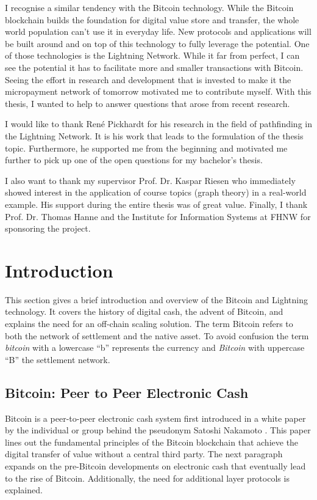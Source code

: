 \documentclass[final]{fhnwreport}       %
\begin{document}
I recognise a similar tendency with the Bitcoin technology. While the Bitcoin blockchain builds the foundation for digital value store and transfer, the whole world population can't use it in everyday life. New protocols and applications will be built around and on top of this technology to fully leverage the potential. One of those technologies is the Lightning Network. While it far from perfect, I can see the potential it has to facilitate more and smaller transactions with Bitcoin. Seeing the effort in research and development that is invested to make it the micropayment network of tomorrow motivated me to contribute myself. With this thesis, I wanted to help to answer questions that arose from recent research.

I would like to thank René Pickhardt for his research in the field of pathfinding in the Lightning Network. It is his work that leads to the formulation of the thesis topic. Furthermore, he supported me from the beginning and motivated me further to pick up one of the open questions for my bachelor's thesis.

I also want to thank my supervisor Prof. Dr. Kaspar Riesen who immediately showed interest in the application of course topics (graph theory) in a real-world example. His support during the entire thesis was of great value. Finally, I thank Prof. Dr. Thomas Hanne and the Institute for Information Systems at FHNW for sponsoring the project.

\clearpage
{}
\section{Introduction} 
This section gives a brief introduction and overview of the Bitcoin and Lightning technology. It covers the history of digital cash, the advent of Bitcoin, and explains the need for an off-chain scaling solution. The term Bitcoin refers to both the network of settlement and the native asset. To avoid confusion the term \emph{bitcoin} with a lowercase ``b'' represents the currency and \emph{Bitcoin} with uppercase ``B'' the settlement network.

\subsection{Bitcoin: Peer to Peer Electronic Cash}\label{subsec:peertopeer}
Bitcoin is a peer-to-peer electronic cash system first introduced in a white paper by the individual or group behind the pseudonym Satoshi Nakamoto \citep{nakamoto_bitcoin_2008}. This paper lines out the fundamental principles of the Bitcoin \gls{blockchain} that achieve the digital transfer of value without a central third party. The next paragraph expands on the pre-Bitcoin developments on electronic cash that eventually lead to the rise of Bitcoin. Additionally, the need for additional layer protocols is explained.
\end{document}
